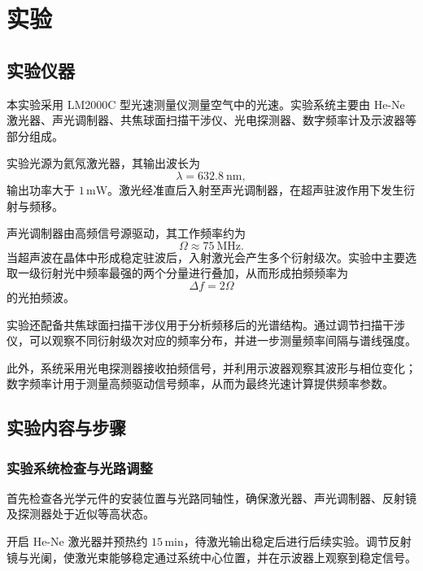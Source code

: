 \documentclass[a4paper]{ctexart}
\begin{document}
    \section{实验}

\subsection{实验仪器}

本实验采用 LM2000C 型光速测量仪测量空气中的光速。实验系统主要由 He-Ne 激光器、声光调制器、共焦球面扫描干涉仪、光电探测器、数字频率计及示波器等部分组成。

实验光源为氦氖激光器，其输出波长为
\[
\lambda = 632.8\ \mathrm{nm},
\]
输出功率大于 $1\,\mathrm{mW}$。激光经准直后入射至声光调制器，在超声驻波作用下发生衍射与频移。

声光调制器由高频信号源驱动，其工作频率约为
\[
\Omega \approx 75\ \mathrm{MHz}.
\]
当超声波在晶体中形成稳定驻波后，入射激光会产生多个衍射级次。实验中主要选取一级衍射光中频率最强的两个分量进行叠加，从而形成拍频频率为
\[
\Delta f = 2\Omega
\]
的光拍频波。

实验还配备共焦球面扫描干涉仪用于分析频移后的光谱结构。通过调节扫描干涉仪，可以观察不同衍射级次对应的频率分布，并进一步测量频率间隔与谱线强度。

此外，系统采用光电探测器接收拍频信号，并利用示波器观察其波形与相位变化；数字频率计用于测量高频驱动信号频率，从而为最终光速计算提供频率参数。



\subsection{实验内容与步骤}

\subsubsection{实验系统检查与光路调整}

首先检查各光学元件的安装位置与光路同轴性，确保激光器、声光调制器、反射镜及探测器处于近似等高状态。

开启 He-Ne 激光器并预热约 $15\,\mathrm{min}$，待激光输出稳定后进行后续实验。调节反射镜与光阑，使激光束能够稳定通过系统中心位置，并在示波器上观察到稳定信号。
\end{document}
